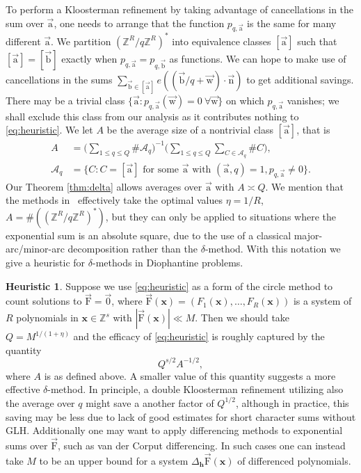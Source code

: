 \documentclass[letterpaper,11pt]{amsart}
\numberwithin{equation}{section}
\theoremstyle{definition}
\newtheorem{heuristic}{Heuristic}
\numberwithin{equation}{section}
\newcommand{\ZZ}{\mathbb{Z}}
\newcommand{\x}{\mathbf{x}}
\newcommand{\ua}{\vec{\mathrm{a}}}
\newcommand{\ub}{\vec{\mathrm{b}}}
\newcommand{\uw}{{\vec{\mathrm{w}}}}
\newcommand{\uF}{{\vec{\mathrm{F}} }}
\newcommand{\nn}{\vec{\mathrm{n}}}
\begin{document}
To perform a Kloosterman refinement by taking advantage of cancellations in the sum over $\ua$, one needs to arrange that the function \(p_{q,\ua}\) is the same for many different \(\ua\). We partition \((\ZZ^R/q\ZZ^R)^*\) into  equivalence classes $[\ua]$ such that \([\ua]=[\ub]\) exactly when \(p_{q,\ua}=p_{q,\ub}\) as functions. We can hope to make use of cancellations in the sums \(\sum_{\ub\in [\ua]}e((\ub/q+\uw)\cdot\nn)\) to get additional savings. 
There may be a trivial class $\{\ua:p_{q,\ua}(\uw)= 0 \ \forall \uw\}$ on which $p_{q,\ua}$ vanishes; we shall exclude this class from our analysis as it contributes nothing to \eqref{eq:heuristic}. We let $A$ be the average size of a nontrivial class $[\ua]$, that is
\begin{align*}
A&=\Big(\sum_{1\leq q\leq Q}
\# \mathcal A_q \Big)^{-1}
\Big(\sum_{1\leq q\leq Q} \sum_{C\in\mathcal A_q}
\#C\Big),
    \\ \mathcal A_q &= \{
C:
C=[\ua] \text{ for some }\ua \text{ with } (\ua,q)=1, p_{q,\ua}\neq 0
\}.
\end{align*}
Our Theorem \ref{thm:delta} allows averages over $\ua$ with $A\asymp Q$.
 We mention that the methods in~\cite{NV,HBP,PSW} effectively take the optimal values $\eta=1/R$, $A=\#((\ZZ^R/q\ZZ^R)^*)$, but  they can only be applied to situations where the exponential sum is an absolute square, due to the use of a classical major-arc/minor-arc decomposition rather than the $\delta$-method.
With this notation we give a heuristic for $\delta$-methods in Diophantine problems.
\begin{heuristic}\label{heu}
Suppose we use \eqref{eq:heuristic} as a form of the circle method to count solutions to $\uF=\vec{0}$, where $\uF(\x)=(F_1(\x), \dots, F_R(\x))$ is a system of $R$ polynomials in $\x\in \mathbb Z^s$ with $|\uF(\x)|\ll M$. Then we should take $Q=M^{1/(1+\eta)}$ and the efficacy of \eqref{eq:heuristic} is roughly captured by the quantity $$Q^{s/2}A^{-1/2},$$ where $A$ is as defined above. A smaller value of this quantity suggests a more effective $\delta$-method. In principle, a double Kloosterman refinement utilizing also the average over $q$ might save a another factor of $Q^{1/2}$, although in practice, this saving may be less due to lack of good estimates for short character sums without GLH. Additionally one may want to apply differencing methods to exponential sums over $\uF$, such as van der Corput differencing. In such cases one can instead take $M$ to be an upper bound for a system $\Delta_{\mathbf h} \uF(\x)$ of differenced polynomials.
\end{heuristic}
\end{document}

